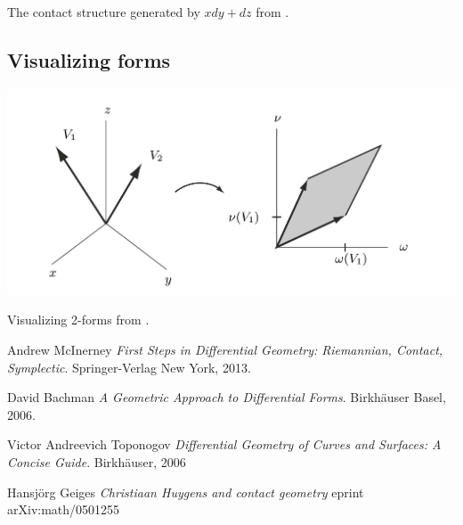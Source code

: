 \documentclass{article}
\begin{document}
The contact structure generated by $xdy + dz$ from \cite{bachman}.

\subsection {Visualizing forms}

\includegraphics[scale=0.5]{form_vis_bachman}

Visualizing 2-forms from \cite{bachman}.


\begin{thebibliography}{9}

{}
  
  Andrew McInerney
  \textit{First Steps in Differential Geometry: Riemannian, Contact, Symplectic}. 
  Springer-Verlag New York, 2013.

  David Bachman
  \textit{A Geometric Approach to Differential Forms}.
  Birkhäuser Basel, 2006.

  Victor Andreevich Toponogov
  \textit{Differential Geometry of Curves and Surfaces: A Concise Guide}. 
  Birkhäuser, 2006

  Hansjörg Geiges
  \textit{Christiaan Huygens and contact geometry}
  eprint arXiv:math/0501255

\end{thebibliography}
\end{document}
